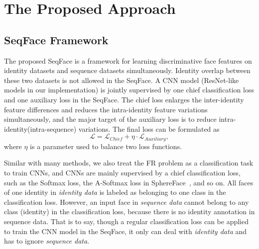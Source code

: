 \documentclass[conference]{acmsiggraph}
\begin{document}
\section{The Proposed Approach}
\label{sec:proposed}

\subsection{SeqFace Framework}
The proposed SeqFace is a framework for learning discriminative face features on identity datasets and sequence datasets simultaneously. \iffalse In \emph{identity data}, faces of one identity are labeled as the same $ID_{identity}$. In \emph{sequence data}, faces in one sequence are labeled as the same $ID_{sequence}$. Two faces with the different $ID_{identity}$ must belong to different identities, but two faces with the different $ID_{sequence}$ might (or might not) belong to one identity. \fi Identity overlap between these two datasets is not allowed in the SeqFace. A CNN model (ResNet-like models in our implementation) is jointly supervised by one chief classification loss and one auxiliary loss in the SeqFace. The chief loss enlarges the inter-identity feature differences and reduces the intra-identity feature variations simultaneously, and the major target of the auxiliary loss is to reduce intra-identity(intra-sequence) variations. The final loss can be formulated as
\begin{equation}
\mathcal{L} = \mathcal{L}_{Chief} + \eta \cdot \mathcal{L}_{Auxiliary},
\label{equTotalLoss}
\end{equation}
where $\eta$ is a parameter used to balance two loss functions.

Similar with many methods, we also treat the FR problem as a classification task to train CNNs, and CNNs are mainly supervised by a chief classification loss, such as the Softmax loss, the A-Softmax loss in SphereFace~\cite{sphereface}, and so on. All faces of one identity in \emph{identity data} is labeled as belonging to one class in the classification loss. However, an input face in \emph{sequence data} cannot belong to any class (identity) in the classification loss, because there is no identity annotation in sequence data. That is to say, though a regular classification loss can be applied to train the CNN model in the SeqFace, it only can deal with \emph{identity data} and has to ignore \emph{sequence data}. 
\end{document}
